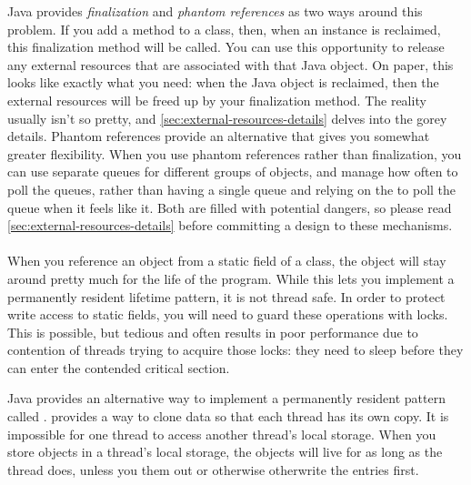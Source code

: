 Java provides \emph{finalization} and \emph{phantom references} as two ways
around this problem.
If you add a  method to a class, then, when an instance is
reclaimed, this finalization method will be called. You can use this opportunity
to release any external resources that are associated with that Java object. On
paper, this looks like exactly what you need: when the Java object is reclaimed,
then the external resources will be freed up by your finalization method. The
reality usually isn't so pretty, and \autoref{sec:external-resources-details}
delves into the gorey details. Phantom references provide an alternative that
gives you somewhat greater flexibility. When you use phantom references rather
than finalization, you can use separate queues for different groups of objects,
and manage how often to poll the queues, rather than having a single queue and
relying on the \jre to poll the queue when it feels like it. Both are filled
with potential dangers, so please read \autoref{sec:external-resources-details}
before committing a design to these mechanisms.

\paragraph{\TLS}
\tlsindex %
\label{sec:thread-local-storage}
When you reference an object from a static field of a class, the object will
stay around pretty much for the life of the program. While this lets you
implement a permanently resident lifetime pattern, it is not thread safe. In
order to protect write access to static fields, you will need to guard these
operations with locks. This is possible, but tedious and often results in poor
performance due to contention of threads trying to acquire those locks: they
need to sleep before they can enter the contended critical section.

Java provides an alternative way to implement a permanently resident pattern
called \emph{\tls\/}. \tls provides a way to clone data so that each thread has
its own copy. It is impossible for one thread to access another thread's local
storage. When you store objects in a thread's local storage, the objects will
live for as long as the thread does, unless you  them out or
otherwise otherwrite the entries first.

